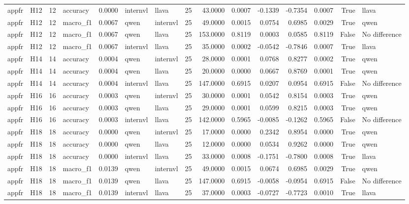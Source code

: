 \begin{table}[tbp]
\begin{tabular}{llrlrllrrrrrrrl}
appfr & H12 & 12 & accuracy & 0.0000 & internvl & llava & 25 & 43.0000 & 0.0007 & -0.1339 & -0.7354 & 0.0007 & True & llava \\
appfr & H12 & 12 & macro\_f1 & 0.0067 & qwen & internvl & 25 & 49.0000 & 0.0015 & 0.0754 & 0.6985 & 0.0029 & True & qwen \\
appfr & H12 & 12 & macro\_f1 & 0.0067 & qwen & llava & 25 & 153.0000 & 0.8119 & 0.0003 & 0.0585 & 0.8119 & False & No difference \\
appfr & H12 & 12 & macro\_f1 & 0.0067 & internvl & llava & 25 & 35.0000 & 0.0002 & -0.0542 & -0.7846 & 0.0007 & True & llava \\
appfr & H14 & 14 & accuracy & 0.0004 & qwen & internvl & 25 & 28.0000 & 0.0001 & 0.0768 & 0.8277 & 0.0002 & True & qwen \\
appfr & H14 & 14 & accuracy & 0.0004 & qwen & llava & 25 & 20.0000 & 0.0000 & 0.0667 & 0.8769 & 0.0001 & True & qwen \\
appfr & H14 & 14 & accuracy & 0.0004 & internvl & llava & 25 & 147.0000 & 0.6915 & 0.0207 & 0.0954 & 0.6915 & False & No difference \\
appfr & H16 & 16 & accuracy & 0.0003 & qwen & internvl & 25 & 30.0000 & 0.0001 & 0.0542 & 0.8154 & 0.0003 & True & qwen \\
appfr & H16 & 16 & accuracy & 0.0003 & qwen & llava & 25 & 29.0000 & 0.0001 & 0.0599 & 0.8215 & 0.0003 & True & qwen \\
appfr & H16 & 16 & accuracy & 0.0003 & internvl & llava & 25 & 142.0000 & 0.5965 & -0.0085 & -0.1262 & 0.5965 & False & No difference \\
appfr & H18 & 18 & accuracy & 0.0000 & qwen & internvl & 25 & 17.0000 & 0.0000 & 0.2342 & 0.8954 & 0.0000 & True & qwen \\
appfr & H18 & 18 & accuracy & 0.0000 & qwen & llava & 25 & 12.0000 & 0.0000 & 0.0534 & 0.9262 & 0.0000 & True & qwen \\
appfr & H18 & 18 & accuracy & 0.0000 & internvl & llava & 25 & 33.0000 & 0.0008 & -0.1751 & -0.7800 & 0.0008 & True & llava \\
appfr & H18 & 18 & macro\_f1 & 0.0139 & qwen & internvl & 25 & 49.0000 & 0.0015 & 0.0674 & 0.6985 & 0.0029 & True & qwen \\
appfr & H18 & 18 & macro\_f1 & 0.0139 & qwen & llava & 25 & 147.0000 & 0.6915 & -0.0058 & -0.0954 & 0.6915 & False & No difference \\
appfr & H18 & 18 & macro\_f1 & 0.0139 & internvl & llava & 25 & 37.0000 & 0.0003 & -0.0727 & -0.7723 & 0.0010 & True & llava \\

\end{tabular}
\end{table}
